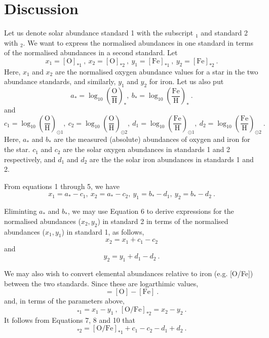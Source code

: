 \section{Discussion}
Let us denote solar abundance standard 1 with the subscript $_1$ and standard 2 with $_2$. We want to express the normalised abundances in one standard in terms of the normalised abundances in a second standard. Let
\begin{equation}
x_1 = [\text{O}]_{*1}\ ,\  x_2 = [\text{O}]_{*2}\ ,\  y_1 = [\text{Fe}]_{*1}\ ,\  y_2 = [\text{Fe}]_{*2}\ .
\end{equation}
Here, $x_1$ and $x_2$ are the normalised oxygen abundance values for a star in the two abundance standards, and similarly, $y_1$ and $y_2$ for iron.
Let us also put
\begin{equation}
a_* = \log_{10}\left(\frac{\text{O}}{\text{H}}\right)_* ,\  b_* =  \log_{10}\left(\frac{\text{Fe}}{\text{H}}\right)_*\ .
\end{equation}
and
\begin{equation}
c_1 = \log_{10}\left(\frac{\text{O}}{\text{H}}\right)_{\odot 1} ,\  c_2 =  \log_{10}\left(\frac{\text{O}}{\text{H}}\right)_{\odot 2} ,\  d_1 = \log_{10}\left(\frac{\text{Fe}}{\text{H}}\right)_{\odot 1} ,\  d_2 =  \log_{10}\left(\frac{\text{Fe}}{\text{H}}\right)_{\odot 2}\ .
\end{equation}
Here, $a_*$ and $b_*$ are the measured (absolute) abundances of oxygen and iron for the star. $c_1$ and $c_2$ are the solar oxygen abundances in standards 1 and 2 respectively, and $d_1$ and $d_2$ are the the solar iron abundances in standards 1 and 2.
  
From equations 1 through 5, we have
\begin{equation}
x_1 = a_* - c_1 ,\  x_2 = a_* - c_2 ,\ y_1 = b_* - d_1 ,\ y_2 = b_* - d_2 \ .
\end{equation}

Eliminting $a_*$ and $b_*$, we may use Equation 6 to derive expressions for the normalised abundances ($x_2, y_2$) in standard 2 in terms of the normalised abundances ($x_1, y_1$)  in standard 1, as follows,
\begin{equation}
x_2 = x_1 + c_1 - c_2 
\end{equation}
and
\begin{equation}
y_2 = y_1 + d_1 - d_2 \ .
\end{equation}

We may also wish to convert elemental abundances relative to iron (e.g. [O/Fe]) between the two standards. Since these are logarthimic values,
\begin{equation}
[\text{O}/\text{Fe}] = [\text{O}] - [\text{Fe}] \ .
\end{equation}
and, in terms of the parameters above,
\begin{equation}
[\text{O}/\text{Fe}]_{*1} = x_1 - y_1 \ ,\  [\text{O}/\text{Fe}]_{*2} = x_2 - y_2 \ .
\end{equation}
It follows from Equations 7, 8 and 10 that
\begin{equation}
[\text{O}/\text{Fe}]_{*2} = [\text{O}/\text{Fe}]_{*1} + c_1 - c_2 - d_1 +d_2 \ .
\end{equation}

